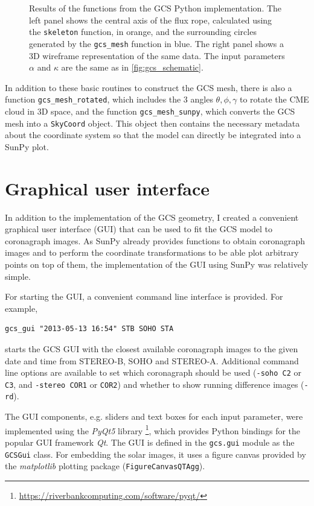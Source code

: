 \begin{figure}
	\centering
	
	\caption[Results of the functions from the GCS Python implementation.]{Results of the functions from the GCS Python implementation. The left panel shows the central axis of the flux rope, calculated using the \texttt{skeleton} function, in orange, and the surrounding circles generated by the \texttt{gcs\_mesh} function in blue. The right panel shows a 3D wireframe representation of the same data. The input parameters $\alpha$ and $\kappa$ are the same as in \autoref{fig:gcs_schematic}.}
	\label{fig:gcs_geometry}
\end{figure}

In addition to these basic routines to construct the GCS mesh, there is also a function \verb|gcs_mesh_rotated|, which includes the 3 angles $\theta, \phi, \gamma$ to rotate the CME cloud in 3D space, and the function \verb|gcs_mesh_sunpy|, which converts the GCS mesh into a \texttt{SkyCoord} object. This object then contains the necessary metadata about the coordinate system so that the model can directly be integrated into a SunPy plot.

\section{Graphical user interface}

In addition to the implementation of the GCS geometry, I created a convenient graphical user interface (GUI) that can be used to fit the GCS model to coronagraph images. As SunPy already provides functions to obtain coronagraph images and to perform the coordinate transformations to be able plot arbitrary points on top of them, the implementation of the GUI using SunPy was relatively simple.

For starting the GUI, a convenient command line interface is provided. For example,
\begin{verbatim}
gcs_gui "2013-05-13 16:54" STB SOHO STA
\end{verbatim}
starts the GCS GUI with the closest available coronagraph images to the given date and time from STEREO-B, SOHO and STEREO-A. Additional command line options are available to set which coronagraph should be used (\texttt{-soho C2} or \texttt{C3}, and \texttt{-stereo COR1} or \texttt{COR2}) and whether to show running difference images (\texttt{-rd}).

The GUI components, e.g. sliders and text boxes for each input parameter, were implemented using the \textit{PyQt5} library \footnote{\url{https://riverbankcomputing.com/software/pyqt/}}, which provides Python bindings for the popular GUI framework \textit{Qt}. The GUI is defined in the \texttt{gcs.gui} module as the \texttt{GCSGui} class. For embedding the solar images, it uses a figure canvas provided by the \textit{matplotlib} plotting package (\texttt{FigureCanvasQTAgg}).

